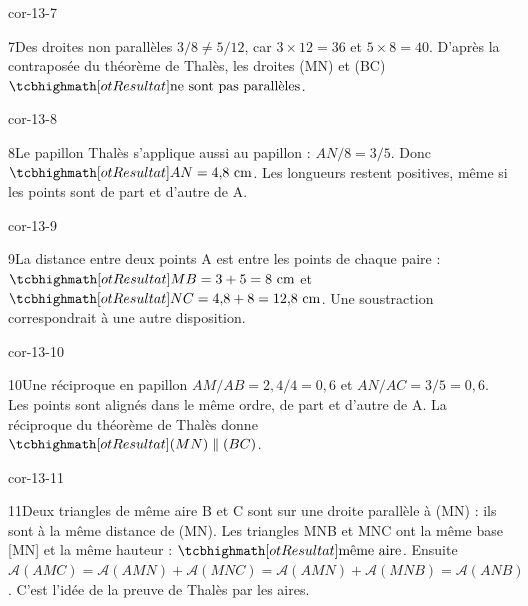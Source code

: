\begin{blocLivre}{cor-13-7}\begin{corrige}{7}{Des droites non parallèles}
$3/8\ne5/12$, car $3\times12=36$ et $5\times8=40$. D’après la contraposée du théorème de Thalès, les droites (MN) et (BC) $\res{\text{ne sont pas parallèles}}$.
\label{fig-cor-13-7}
\end{corrige}\end{blocLivre}
\begin{blocLivre}{cor-13-8}\begin{corrige}{8}{Le papillon}
Thalès s’applique aussi au papillon : $AN/8=3/5$. Donc $\res{AN=4{,}8\text{ cm}}$. Les longueurs restent positives, même si les points sont de part et d’autre de A.
\label{fig-cor-13-8}
\end{corrige}\end{blocLivre}
\begin{blocLivre}{cor-13-9}\begin{corrige}{9}{La distance entre deux points}
A est entre les points de chaque paire : $\res{MB=3+5=8\text{ cm}}$ et $\res{NC=4{,}8+8=12{,}8\text{ cm}}$. Une soustraction correspondrait à une autre disposition.
\label{fig-cor-13-9}
\end{corrige}\end{blocLivre}
\begin{blocLivre}{cor-13-10}\begin{corrige}{10}{Une réciproque en papillon}
$AM/AB=2{,}4/4=0{,}6$ et $AN/AC=3/5=0{,}6$. Les points sont alignés dans le même ordre, de part et d’autre de A. La réciproque du théorème de Thalès donne $\res{(MN)\parallel(BC)}$.
\label{fig-cor-13-10}
\end{corrige}\end{blocLivre}
\begin{blocLivre}{cor-13-11}\begin{corrige}{11}{Deux triangles de même aire}
B et C sont sur une droite parallèle à (MN) : ils sont à la même distance de (MN). Les triangles MNB et MNC ont la même base [MN] et la même hauteur : $\res{\text{même aire}}$. Ensuite $\mathcal A(AMC)=\mathcal A(AMN)+\mathcal A(MNC)=\mathcal A(AMN)+\mathcal A(MNB)=\mathcal A(ANB)$. C’est l’idée de la preuve de Thalès par les aires.
\label{fig-cor-13-11}
\end{corrige}\end{blocLivre}
